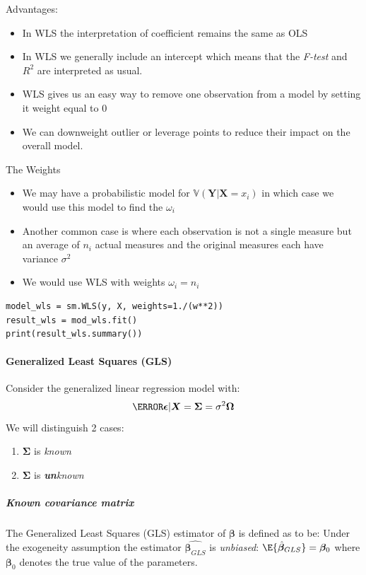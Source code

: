 Advantages:
\begin{itemize}
	\item In WLS the interpretation of coefficient remains the same as OLS
	\item In WLS we generally include an intercept which means that the \emph{F-test} and 
		$R^{2}$ are interpreted as usual. 
	\item WLS gives us an easy way to remove one observation from a model by setting it 
		weight equal to 0
	\item  We can downweight outlier or leverage points to reduce their impact on the overall
		model.
\end{itemize}

The Weights
\begin{itemize}
	\item We may have a probabilistic model for $\mathbb{V}\left(\bm{Y}|\bm{X}=x_{i}\right)$
		in which case we would use this model to find the $\omega_{i}$
	\item Another common case is where each observation is not a single measure but an 
		average of $n_{i}$ actual measures and the original measures each have variance
		$\sigma^{2}$
	\item We would use WLS with weights $\omega_{i}=n_{i}$
\end{itemize}

\begin{lstlisting}
model_wls = sm.WLS(y, X, weights=1./(w**2))
result_wls = mod_wls.fit()
print(result_wls.summary())
\end{lstlisting}

\paragraph{Generalized Least Squares (GLS)}
Consider the generalized linear regression model with:
$$ \V{\bm{\epsilon}|\bm{X}} = \bm{\Sigma}=\sigma^{2}\bm{\Omega}$$
We will distinguish 2 cases:
\begin{enumerate}
	\item $\bm{\Sigma}$ is \emph{known}
	\item $\bm{\Sigma}$ is \emph{\textbf{un}known}
\end{enumerate}
\subparagraph{Known covariance matrix}
The Generalized Least Squares (GLS) estimator of $\bm{\beta}$ is defined as to be:
Under the exogeneity assumption the estimator $\hat{\bm{\beta}_{GLS}}$ is \emph{unbiased}:
$\E{\hat{\bm{\beta}}_{GLS}}=\bm{\beta}_{0}$ where $\bm{\beta}_{0}$ denotes the true value of the
parameters.\\

